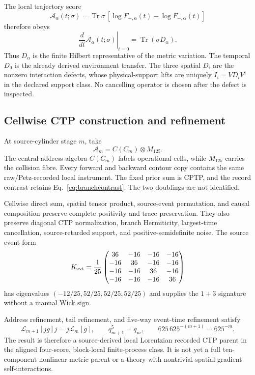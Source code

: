 \documentclass[11pt]{article}
\theoremstyle{definition}
\theoremstyle{remark}
\begin{document}
The local trajectory score
\begin{equation}
 \mathcal A_\alpha(t;\sigma)=
 \operatorname{Tr}\sigma\,[\log F_{+,\alpha}(t)-\log F_{-,\alpha}(t)]
\end{equation}
therefore obeys
\begin{equation}
 \left.\frac{d}{dt}\mathcal A_\alpha(t;\sigma)\right|_{t=0}
 =\operatorname{Tr}(\sigma D_\alpha).
\end{equation}
Thus $D_\alpha$ is the finite Hilbert representative of the metric variation. The temporal $D_0$ is the already derived environment transfer. The three spatial $D_i$ are the nonzero interaction defects, whose physical-support lifts are uniquely $I_i=VD_iV^\dagger$ in the declared support class. No cancelling operator is chosen after the defect is inspected.

\subsection{Cellwise CTP construction and refinement}

At source-cylinder stage $m$, take
\begin{equation}
 \mathcal A_m=C(C_m)\otimes M_{125}.
\end{equation}
The central address algebra $C(C_m)$ labels operational cells, while $M_{125}$ carries the collision fibre. Every forward and backward contour copy contains the same raw/Petz-recorded local instrument. The fixed prior sum is CPTP, and the record contrast retains Eq.~\eqref{eq:branchcontrast}. The two doublings are not identified.

Cellwise direct sum, spatial tensor product, source-event permutation, and causal composition preserve complete positivity and trace preservation. They also preserve diagonal CTP normalization, branch Hermiticity, largest-time cancellation, source-retarded support, and positive-semidefinite noise. The source event form
\begin{equation}
 K_{\rm evt}=\frac1{25}
 \begin{pmatrix}
 36&-16&-16&-16\\
 -16&36&-16&-16\\
 -16&-16&36&-16\\
 -16&-16&-16&36
 \end{pmatrix}
\end{equation}
has eigenvalues $(-12/25,52/25,52/25,52/25)$ and supplies the $1+3$ signature without a manual Wick sign.

Address refinement, tail refinement, and five-way event-time refinement satisfy
\begin{equation}
 \mathcal L_{m+1}[jg]j=j\mathcal L_m[g],
 \qquad q_{m+1}^{5}=q_m,
 \qquad 625\,625^{-(m+1)}=625^{-m}.
\end{equation}
The result is therefore a source-derived local Lorentzian recorded CTP parent in the aligned four-score, block-local finite-process class. It is not yet a full ten-component nonlinear metric parent or a theory with nontrivial spatial-gradient self-interactions.
\end{document}
